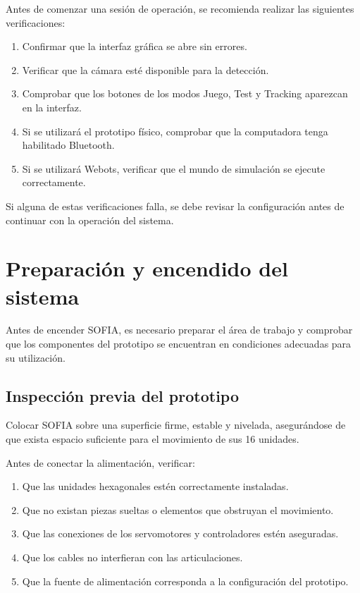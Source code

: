 \documentclass[letterpaper,journal]{IEEEtran}
\begin{document}
Antes de comenzar una sesión de operación,
se recomienda realizar las siguientes
verificaciones:

\begin{enumerate}
    \item Confirmar que la interfaz gráfica
    se abre sin errores.

    \item Verificar que la cámara esté
    disponible para la detección.

    \item Comprobar que los botones de los
    modos Juego, Test y Tracking aparezcan
    en la interfaz.

    \item Si se utilizará el prototipo físico,
    comprobar que la computadora tenga
    habilitado Bluetooth.

    \item Si se utilizará Webots, verificar
    que el mundo de simulación se ejecute
    correctamente.
\end{enumerate}

Si alguna de estas verificaciones falla,
se debe revisar la configuración antes
de continuar con la operación del sistema.

\section{Preparación y encendido del sistema}
\label{sec:encendido}

Antes de encender SOFIA, es necesario preparar el
área de trabajo y comprobar que los componentes
del prototipo se encuentran en condiciones
adecuadas para su utilización.

\subsection{Inspección previa del prototipo}

Colocar SOFIA sobre una superficie firme, estable
y nivelada, asegurándose de que exista espacio
suficiente para el movimiento de sus 16 unidades.

Antes de conectar la alimentación, verificar:

\begin{enumerate}
    \item Que las unidades hexagonales estén
    correctamente instaladas.
    \item Que no existan piezas sueltas o
    elementos que obstruyan el movimiento.
    \item Que las conexiones de los servomotores
    y controladores estén aseguradas.
    \item Que los cables no interfieran con
    las articulaciones.
    \item Que la fuente de alimentación
    corresponda a la configuración del prototipo.
\end{enumerate}
\end{document}
